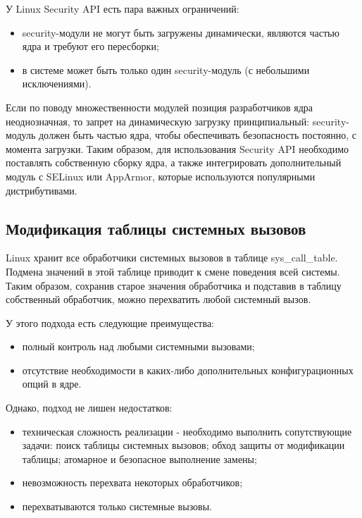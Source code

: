 У Linux Security API есть пара важных ограничений:
\begin{itemize}
	\item security-модули не могут быть загружены динамически, являются частью ядра и требуют его пересборки;
	\item в системе может быть только один security-модуль (с небольшими исключениями).
\end{itemize}

Если по поводу множественности модулей позиция разработчиков ядра неоднозначная, то запрет на динамическую загрузку принципиальный: security-модуль должен быть частью ядра, чтобы обеспечивать безопасность постоянно, с момента загрузки. Таким образом, для использования Security API необходимо поставлять собственную сборку ядра, а также интегрировать дополнительный модуль с SELinux или AppArmor, которые используются популярными дистрибутивами.

\subsection{Модификация таблицы системных вызовов}
Linux хранит все обработчики системных вызовов в таблице sys\_call\_table. Подмена значений в этой таблице приводит к смене поведения всей системы. Таким образом, сохранив старое значения обработчика и подставив в таблицу собственный обработчик, можно перехватить любой системный вызов.

У этого подхода есть следующие преимущества:
\begin{itemize}
	\item полный контроль над любыми системными вызовами;
	\item отсутствие необходимости в каких-либо дополнительных конфигурационных опций в ядре.
\end{itemize}

Однако, подход не лишен недостатков:
\begin{itemize}
	\item техническая сложность реализации - необходимо выполнить сопутствующие задачи: поиск таблицы системных вызовов; обход защиты от модификации таблицы; атомарное и безопасное выполнение замены;
	\item невозможность перехвата некоторых обработчиков;
	\item перехватываются только системные вызовы.
\end{itemize}

